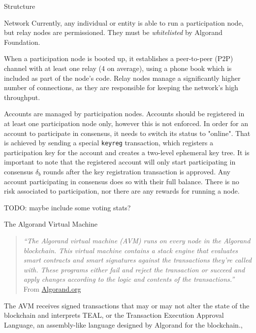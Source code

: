 \documentclass[10pt,a4paper]{article}
\begin{document}
\begin{section}{Strutcture}
\begin{subsection}{Network}
Currently, any individual or entity is able to run a participation node, 
but relay nodes are permissioned. They must be {\em whitelisted} by 
Algorand Foundation.

When a participation node is booted up, it establishes a peer-to-peer (P2P) 
channel with at least one relay (4 on average), using a phone book which is included
as part of the node's code. 
Relay nodes manage a significantly higher number of connections, as they 
are responsible for keeping the network's high throughput.

Accounts are managed by participation nodes. Accounts should be registered in at least one participation
node only, however this is not enforced.
In order for an account to participate in consensus, it needs to switch its status to "online". 
That is achieved by sending a special {\tt keyreg} transaction,
which registers a participation key for the account and creates a two-level ephemeral key tree.
It is important to note that the registered account will only start participating in consensus
$\delta_b$ rounds after the key registration transaction is approved.
Any account participating in consensus does so with their full balance. There is no risk
associated to participation, nor there are any rewards for running a node.


TODO: maybe include some voting stats?

\end{subsection}
\begin{subsection}{The Algorand Virtual Machine}\label{sect:avm}
    
    \begin{quote} 
        {\em``The Algorand virtual machine (AVM) runs on every node in the Algorand blockchain. 
    This virtual machine contains a stack engine that evaluates smart contracts and smart 
    signatures against the transactions they're called with. These programs either fail 
    and reject the transaction or succeed and apply changes according to the logic and 
    contents of the transactions.''} From \href{https://developer.algorand.org/docs/get-details/dapps/avm/}{Algorand.org}
    \end{quote}
    
The AVM receives signed transactions that may or may not alter the 
state of the blockchain and interprets TEAL, or the Transaction Execution 
Approval Language, an assembly-like language designed by Algorand 
for the blockchain.,


\end{subsection}
\end{section}
\end{document}
